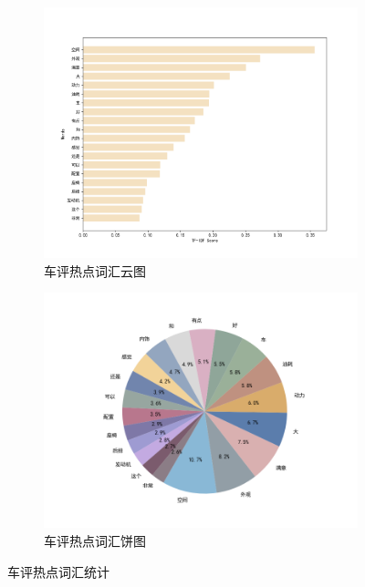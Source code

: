   \begin{figure}[htbp]
    \centering
    
    \begin{subfigure}{0.45\textwidth}
      \includegraphics[width=\linewidth]{pictures/33.png}
      \caption{车评热点词汇云图}
    \end{subfigure}
     \hspace{0.3em}%
    \begin{subfigure}{0.5\textwidth}
      \includegraphics[width=\linewidth]{pictures/37.png}
      \caption{车评热点词汇饼图}
    \end{subfigure}
    
    
    \caption{车评热点词汇统计}
    \end{figure}

